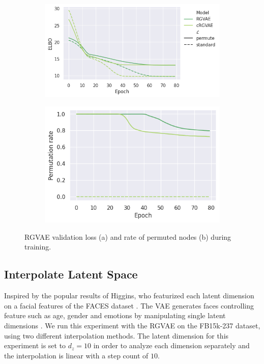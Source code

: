 \begin{figure}
  \right
  \begin{subfigure}{.55\textwidth}
    \left
    \includegraphics[height=.5\textwidth, keepaspectratio]{graphs/plots/permute_loss.png}
    \label{fig5:permELBO}
  \end{subfigure}%
  \begin{subfigure}{.55\textwidth}
    \left
    \includegraphics[height=.5\textwidth]{graphs/plots/permute_permutation_wol.png}
    \label{fig5:permRate}
  \end{subfigure}
  \caption{RGVAE validation loss (a) and rate of permuted nodes (b) during training.}
  \label{fig5:permInv}
\end{figure}

\subsection{Interpolate Latent Space}

Inspired by the popular results of Higgins, who featurized each latent dimension on a facial features of the FACES dataset \cite{ebner_facesdatabase_2010}. The VAE generates faces controlling feature such as age, gender and emotions by manipulating single latent dimensions \cite{higgins_beta-vae_2016}.  We run this experiment with the RGVAE on the FB15k-237 dataset, using two different interpolation methods. The latent dimension for this experiment is set to $d_{z}=10$ in order to analyze each dimension separately and the interpolation is linear with a step count of $10$.

